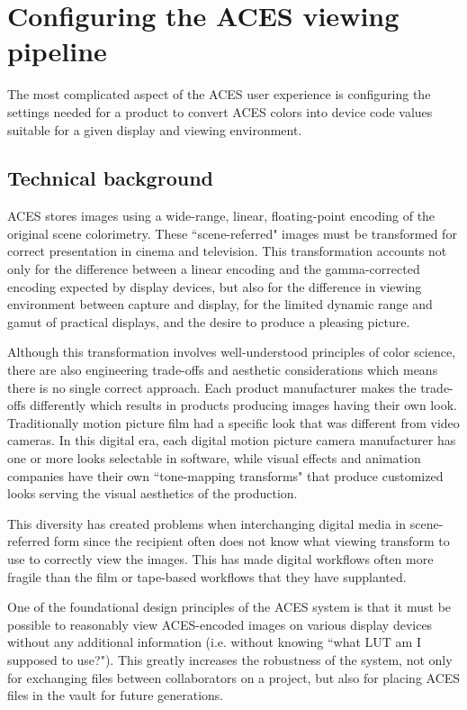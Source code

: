 \numberedformat
\chapter{Configuring the ACES viewing pipeline}

The most complicated aspect of the ACES user experience is configuring the settings needed for a product to convert ACES colors into device code values suitable for a given display and viewing environment.

\section{Technical background}
ACES stores images using a wide-range, linear, floating-point encoding of the original scene colorimetry. These ``scene-referred" images must be transformed for correct presentation in cinema and television. This transformation accounts not only for the difference between a linear encoding and the gamma-corrected encoding expected by display devices, but also for the difference in viewing environment between capture and display, for the limited dynamic range and gamut of practical displays, and the desire to produce a pleasing picture.

Although this transformation involves well-understood principles of color science, there are also engineering trade-offs and aesthetic considerations which means there is no single correct approach. Each product manufacturer makes the trade-offs differently which results in products producing images having their own look. Traditionally motion picture film had a specific look that was different from video cameras. In this digital era, each digital motion picture camera manufacturer has one or more looks selectable in software, while visual effects and animation companies have their own ``tone-mapping transforms" that produce customized looks serving the visual aesthetics of the production.

This diversity has created problems when interchanging digital media in scene-referred form since the recipient often does not know what viewing transform to use to correctly view the images. This has made digital workflows often more fragile than the film or tape-based workflows that they have supplanted.

One of the foundational design principles of the ACES system is that it must be possible to reasonably view ACES-encoded images on various display devices without any additional information (i.e. without knowing ``what LUT am I supposed to use?"). This greatly increases the robustness of the system, not only for exchanging files between collaborators on a project, but also for placing ACES files in the vault for future generations.

